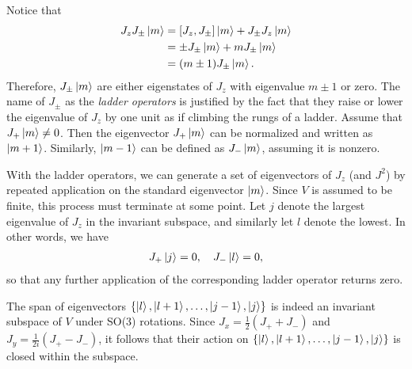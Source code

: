 Notice that
\begin{align*}
    J_z J_\pm\ket{m} &= [J_z,J_\pm]\ket{m} + J_\pm J_z\ket{m} \\
    &= \pm J_\pm\ket{m} + m J_\pm\ket{m} \\
    &= (m\pm 1)J_\pm\ket{m}.
\end{align*}
Therefore, $J_\pm\ket{m}$ are either eigenstates of $J_z$ with eigenvalue $m\pm 1$ or zero. The name of $J_\pm$ as the \textit{ladder operators} is justified by the fact that they raise or lower the eigenvalue of $J_z$ by one unit as if climbing the rungs of a ladder. Assume that $J_+\ket{m}\neq 0$. Then the eigenvector $J_+\ket{m}$ can be normalized and written as $\ket{m+1}$. Similarly, $\ket{m-1}$ can be defined as $J_-\ket{m}$, assuming it is nonzero.

With the ladder operators, we can generate a set of eigenvectors of $J_z$ (and $J^2$) by repeated application on the standard eigenvector $\ket{m}$. Since $V$ is assumed to be finite, this process must terminate at some point. Let $j$ denote the largest eigenvalue of $J_z$ in the invariant subspace, and similarly let $l$ denote the lowest. In other words, we have
\begin{align*}
    J_+\ket{j} = 0, \quad J_-\ket{l} = 0,
\end{align*}
so that any further application of the corresponding ladder operator returns zero.

The span of eigenvectors $\left\{ \ket{l}, \ket{l+1}, \dots, \ket{j-1}, \ket{j} \right\}$ is indeed an invariant subspace of $V$ under SO(3) rotations. Since $J_x = \frac{1}{2}(J_+ + J_-)$ and $J_y = \frac{1}{2i}(J_+ - J_-)$, it follows that their action on $\left\{ \ket{l}, \ket{l+1}, \dots, \ket{j-1}, \ket{j} \right\}$ is closed within the subspace.

